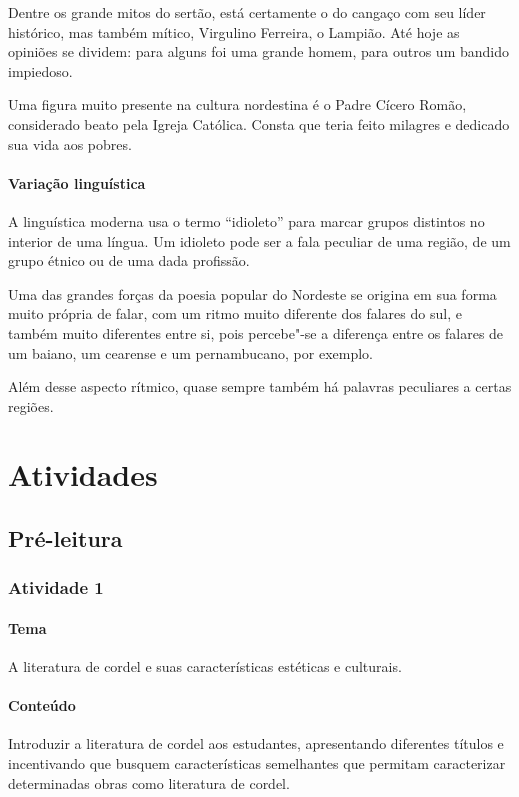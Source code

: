 \documentclass[11pt]{extarticle}
\begin{document}
Dentre os grande mitos do sertão, está certamente o do cangaço com seu líder
histórico, mas também mítico, Virgulino Ferreira, o Lampião. Até hoje as
opiniões se dividem: para alguns foi uma grande homem, para outros um bandido
impiedoso. 

Uma figura muito presente na cultura nordestina é o Padre Cícero Romão,
considerado beato pela Igreja Católica. Consta que teria feito milagres e
dedicado sua vida aos pobres. 

\paragraph{Variação linguística}

A linguística moderna usa o termo “idioleto” para marcar grupos distintos no
interior de uma língua. Um idioleto pode ser a fala peculiar de uma região, de
um grupo étnico ou de uma dada profissão. 

Uma das grandes forças da poesia popular do Nordeste se origina em sua forma
muito própria de falar, com um ritmo muito diferente dos falares do sul, e
também muito diferentes entre si, pois percebe"-se a diferença entre os falares
de um baiano, um cearense e um pernambucano, por exemplo.

Além desse aspecto rítmico, quase sempre também há palavras peculiares a certas
regiões. 


\section{Atividades}

\subsection{Pré-leitura}

\subsubsection{Atividade 1}


\paragraph{Tema} A literatura de cordel e suas características estéticas e culturais.

\paragraph{Conteúdo} Introduzir a literatura de cordel aos estudantes, apresentando diferentes títulos e incentivando que busquem características semelhantes que permitam caracterizar determinadas obras como literatura de cordel.
\end{document}

